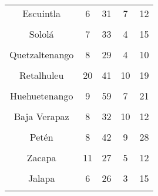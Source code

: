 \begin{tabular}[t]{ccccc}
Escuintla & 6 & 31 & 7 & 12\\
\cellcolor[HTML]{B6B3FF}{Santa Rosa} & \cellcolor[HTML]{B6B3FF}{5} & \cellcolor[HTML]{B6B3FF}{36} & \cellcolor[HTML]{B6B3FF}{5} & \cellcolor[HTML]{B6B3FF}{14}\\
Sololá & 7 & 33 & 4 & 15\\
\cellcolor[HTML]{B6B3FF}{Totonicapán} & \cellcolor[HTML]{B6B3FF}{3} & \cellcolor[HTML]{B6B3FF}{36} & \cellcolor[HTML]{B6B3FF}{6} & \cellcolor[HTML]{B6B3FF}{12}\\
Quetzaltenango & 8 & 29 & 4 & 10\\
\cellcolor[HTML]{B6B3FF}{Suchitepéquez} & \cellcolor[HTML]{B6B3FF}{14} & \cellcolor[HTML]{B6B3FF}{53} & \cellcolor[HTML]{B6B3FF}{15} & \cellcolor[HTML]{B6B3FF}{21}\\
Retalhuleu & 20 & 41 & 10 & 19\\
\cellcolor[HTML]{B6B3FF}{San Marcos} & \cellcolor[HTML]{B6B3FF}{5} & \cellcolor[HTML]{B6B3FF}{52} & \cellcolor[HTML]{B6B3FF}{2} & \cellcolor[HTML]{B6B3FF}{19}\\
Huehuetenango & 9 & 59 & 7 & 21\\
\cellcolor[HTML]{B6B3FF}{Quiché} & \cellcolor[HTML]{B6B3FF}{7} & \cellcolor[HTML]{B6B3FF}{42} & \cellcolor[HTML]{B6B3FF}{6} & \cellcolor[HTML]{B6B3FF}{19}\\
Baja Verapaz & 8 & 32 & 10 & 12\\
\cellcolor[HTML]{B6B3FF}{Alta Verapaz} & \cellcolor[HTML]{B6B3FF}{7} & \cellcolor[HTML]{B6B3FF}{36} & \cellcolor[HTML]{B6B3FF}{4} & \cellcolor[HTML]{B6B3FF}{17}\\
Petén & 8 & 42 & 9 & 28\\
\cellcolor[HTML]{B6B3FF}{Izabal} & \cellcolor[HTML]{B6B3FF}{8} & \cellcolor[HTML]{B6B3FF}{24} & \cellcolor[HTML]{B6B3FF}{7} & \cellcolor[HTML]{B6B3FF}{14}\\
Zacapa & 11 & 27 & 5 & 12\\
\cellcolor[HTML]{B6B3FF}{Chiquimula} & \cellcolor[HTML]{B6B3FF}{10} & \cellcolor[HTML]{B6B3FF}{27} & \cellcolor[HTML]{B6B3FF}{3} & \cellcolor[HTML]{B6B3FF}{15}\\
Jalapa & 6 & 26 & 3 & 15\\
\cellcolor[HTML]{B6B3FF}{Jutiapa} & \cellcolor[HTML]{B6B3FF}{8} & \cellcolor[HTML]{B6B3FF}{35} & \cellcolor[HTML]{B6B3FF}{4} & \cellcolor[HTML]{B6B3FF}{14}\\
\bottomrule
\end{tabular}
